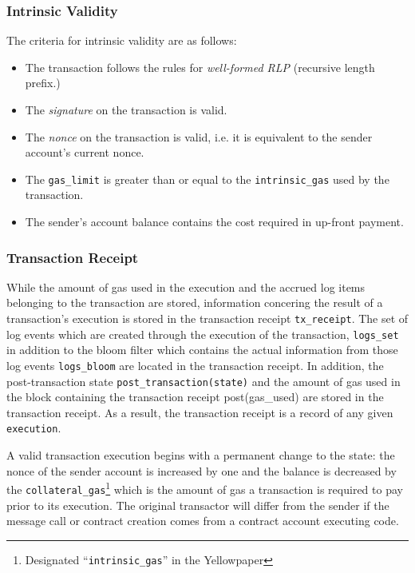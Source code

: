 \documentclass[10pt,a4paper,leqno,bibliography=totoc]{scrartcl}
\newenvironment{alphafootnotes}
{\par\edef\savedfootnotenumber{\number\value{footnote}}
\renewcommand{\thefootnote}{\alph{footnote}}
\setcounter{footnote}{0}}
{\par\setcounter{footnote}{\savedfootnotenumber}}
\begin{document}
\begin{alphafootnotes}
\begin{multicols*}{2}
			\subsubsection{Intrinsic Validity}
				The criteria for intrinsic validity are as follows:
				\begin{itemize}
				\item The transaction follows the rules for \textsl{well-formed RLP} (recursive length prefix.)
				\item The \textsl{signature} on the transaction is valid.
				\item The \textsl{nonce} on the transaction is valid, i.e. it is equivalent to the sender account's current nonce.
				\item The \texttt{gas\_limit} is greater than or equal to the \texttt{intrinsic\_gas} used by the transaction.
				\item The sender's account balance contains the cost required in up-front payment.
				\end{itemize}

			\subsubsection{Transaction Receipt}
				While the amount of gas used in the execution and the accrued log items belonging to the transaction are stored, information concering the result of a transaction's execution is stored in the transaction receipt \texttt{tx\_receipt}. The set of log events which are created through the execution of the transaction, \texttt{logs\_set} in addition to the bloom filter which contains the actual information from those log events \texttt{logs\_bloom} are located in the transaction receipt. In addition, the post-transaction state \texttt{post\_transaction(state)} and the amount of gas used in the block containing the transaction receipt post(gas\_used) are stored in the transaction receipt. As a result, the transaction receipt is a record of any given \texttt{execution}.
					
					A valid transaction execution begins with a permanent change to the state: the nonce of the sender account is increased by one and the balance is decreased by the \texttt{collateral\_gas}\footnote{Designated ``\texttt{intrinsic\_gas}'' in the Yellowpaper} which is the amount of gas a transaction is required to pay prior to its execution. The original transactor will differ from the sender if the message call or contract creation comes from a contract account executing code. 
			

\end{multicols*}
\end{alphafootnotes}
\end{document}
